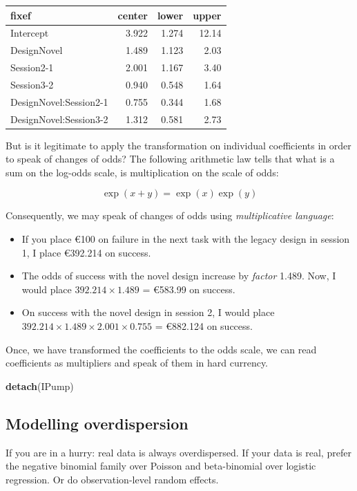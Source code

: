 \documentclass[]{svmono}
\newcommand{\euro}{€}
\newenvironment{Shaded}{\begin{snugshade}}{\end{snugshade}}
\newcommand{\KeywordTok}[1]{\textcolor[rgb]{0.13,0.29,0.53}{\textbf{#1}}}
\newcommand{\NormalTok}[1]{#1}
\providecommand{\tightlist}{%
  \setlength{\itemsep}{0pt}\setlength{\parskip}{0pt}}
\theoremstyle{definition}
\theoremstyle{definition}
\theoremstyle{definition}
\theoremstyle{remark}
\begin{document}
\begin{longtable}[]{@{}lrrr@{}}
\toprule
fixef & center & lower & upper\tabularnewline
\midrule
\endhead
Intercept & 3.922 & 1.274 & 12.14\tabularnewline
DesignNovel & 1.489 & 1.123 & 2.03\tabularnewline
Session2-1 & 2.001 & 1.167 & 3.40\tabularnewline
Session3-2 & 0.940 & 0.548 & 1.64\tabularnewline
DesignNovel:Session2-1 & 0.755 & 0.344 & 1.68\tabularnewline
DesignNovel:Session3-2 & 1.312 & 0.581 & 2.73\tabularnewline
\bottomrule
\end{longtable}

But is it legitimate to apply the transformation on individual
coefficients in order to speak of changes of odds? The following
arithmetic law tells that what is a sum on the log-odds scale, is
multiplication on the scale of odds:

\[
\exp(x + y) = \exp(x)\exp(y)
\]

Consequently, we may speak of changes of odds using \emph{multiplicative
language}:

\begin{itemize}
\tightlist
\item
  If you place \euro{}100 on failure in the next task with the legacy
  design in session 1, I place \euro{}392.214 on success.
\item
  The odds of success with the novel design increase by \emph{factor}
  1.489. Now, I would place \(392.214 \times 1.489\) = \euro{}583.99 on
  success.
\item
  On success with the novel design in session 2, I would place
  \(392.214 \times 1.489 \times 2.001 \times 0.755\) = \euro{}882.124 on
  success.
\end{itemize}

Once, we have transformed the coefficients to the odds scale, we can
read coefficients as multipliers and speak of them in hard currency.

\begin{Shaded}
\begin{Highlighting}[]
\KeywordTok{detach}\NormalTok{(IPump)}
\end{Highlighting}
\end{Shaded}

\subsection{Modelling overdispersion}\label{modelling-overdispersion}

If you are in a hurry: real data is always overdispersed. If your data
is real, prefer the negative binomial family over Poisson and
beta-binomial over logistic regression. Or do observation-level random
effects.
\end{document}
